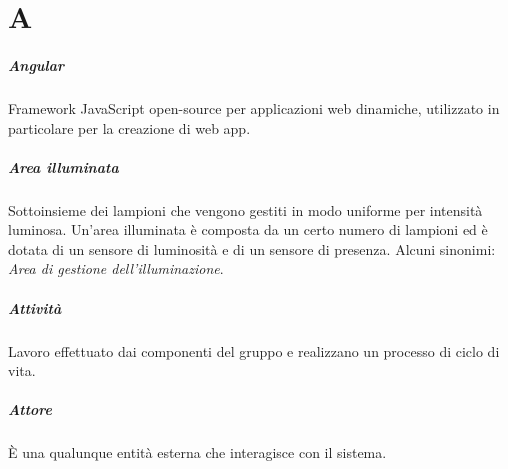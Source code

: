 \chapter{A}

\paragraph*{Angular}
Framework JavaScript open-source per applicazioni web dinamiche, utilizzato in particolare per la creazione di web app.

\paragraph*{Area illuminata}
Sottoinsieme dei lampioni che vengono gestiti in modo uniforme per intensità luminosa. Un'area illuminata è composta da un certo numero di lampioni ed è dotata di un sensore di luminosità e di un sensore di presenza. Alcuni sinonimi: \textit{Area di gestione dell'illuminazione}.

\paragraph*{Attività}
Lavoro effettuato dai componenti del gruppo e realizzano un processo di ciclo di vita.

\paragraph*{Attore}
È una qualunque entità esterna che interagisce con il sistema.
